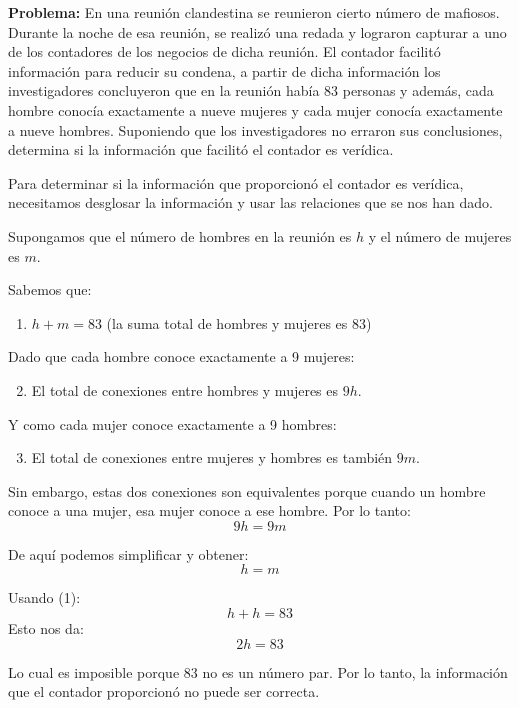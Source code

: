 \documentclass{article}
\begin{document}
\textbf{Problema:}
En una reunión clandestina se reunieron cierto número de mafiosos. Durante la noche de esa reunión, se realizó una redada y lograron capturar a uno de los contadores de los negocios de dicha reunión. El contador facilitó información para reducir su condena, a partir de dicha información los investigadores concluyeron que en la reunión había 83 personas y además, cada hombre conocía exactamente a nueve mujeres y cada mujer conocía exactamente a nueve hombres. Suponiendo que los investigadores no erraron sus conclusiones, determina si la información que facilitó el contador es verídica.

\bigskip

Para determinar si la información que proporcionó el contador es verídica, necesitamos desglosar la información y usar las relaciones que se nos han dado.

Supongamos que el número de hombres en la reunión es \( h \) y el número de mujeres es \( m \).

Sabemos que:
\begin{enumerate}
    \item \( h + m = 83 \) (la suma total de hombres y mujeres es 83)
\end{enumerate}

Dado que cada hombre conoce exactamente a 9 mujeres:
\begin{enumerate}
    \setcounter{enumi}{1}
    \item El total de conexiones entre hombres y mujeres es \( 9h \).
\end{enumerate}

Y como cada mujer conoce exactamente a 9 hombres:
\begin{enumerate}
    \setcounter{enumi}{2}
    \item El total de conexiones entre mujeres y hombres es también \( 9m \).
\end{enumerate}

Sin embargo, estas dos conexiones son equivalentes porque cuando un hombre conoce a una mujer, esa mujer conoce a ese hombre. Por lo tanto:
\[ 9h = 9m \]

De aquí podemos simplificar y obtener:
\[ h = m \]

Usando (1):
\[ h + h = 83 \]
Esto nos da:
\[ 2h = 83 \]

Lo cual es imposible porque 83 no es un número par. Por lo tanto, la información que el contador proporcionó no puede ser correcta.

\bigskip
\end{document}

